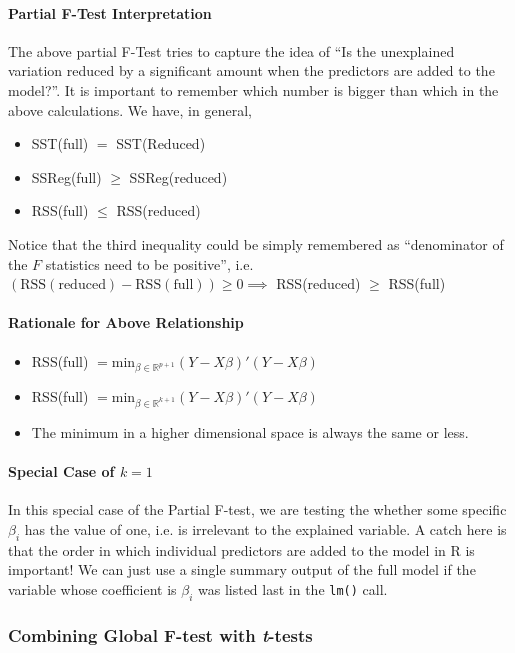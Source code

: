 \documentclass[10pt]{article}
\newcommand{\real}{\mathbb{R}}
\begin{document}
\paragraph{Partial F-Test Interpretation} 
The above partial F-Test tries to capture the idea of \color{BurntOrange}``Is the unexplained variation reduced by a significant amount when the predictors are added to the model?''.\color{Black} It is important to remember which number is bigger than which in the above calculations. We have, in general, 
\begin{itemize}
    \item SST(full) $=$ SST(Reduced)
    \item SSReg(full) $\geq$ SSReg(reduced)
    \item RSS(full) $\leq$ RSS(reduced)
\end{itemize}
Notice that the third inequality could be simply remembered as ``denominator of the $F$ statistics need to be positive'', i.e. $(\mathrm{RSS}(\mathrm{reduced})-\mathrm{RSS}(\mathrm{full})) \geq 0 \implies $ RSS(reduced) $\geq$ RSS(full)
\paragraph{Rationale for Above Relationship}
\begin{itemize}
    \item RSS(full) $ = \mathrm{min}_{\beta \in \real^{p+1}} (Y - X\beta)'(Y - X\beta)$
    \item RSS(full) $ = \mathrm{min}_{\beta \in \real^{k+1}} (Y - X\beta)'(Y - X\beta)$
    \item The minimum in a higher dimensional space is always the same or less.
\end{itemize}


\paragraph{Special Case of $k = 1$}
In this special case of the Partial F-test, we are testing the whether some specific $\beta_i$ has the value of one, i.e. is irrelevant to the explained variable. A catch here is that \color{BurntOrange} the order in which individual predictors are added to the model in R is important! \color{Black} We can just use a single summary output of the full model if the variable whose coefficient is $\beta_i$ was listed last in the \texttt{lm()} call.
\subsubsection{Combining Global F-test with \textit{t}-tests}
\end{document}
